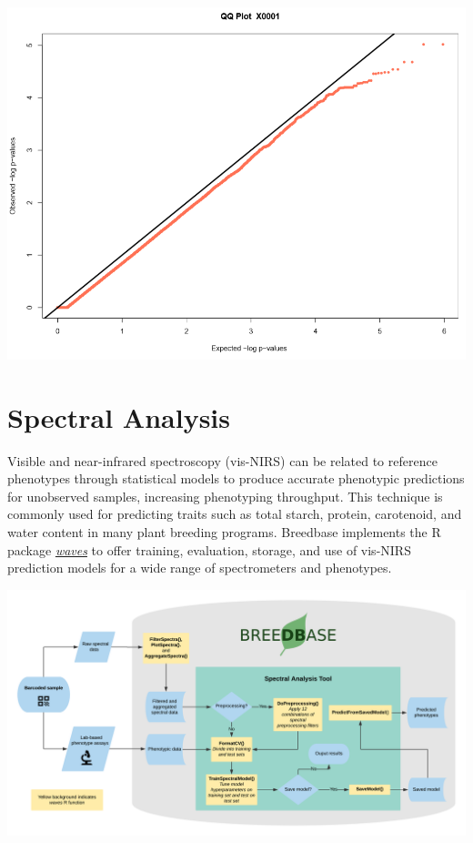 \documentclass[
  12pt,
]{book}
\begin{document}
\begin{center}\includegraphics[width=0.95\linewidth]{assets/images/search_wizard_genotype_analyses_qq_plot} \end{center}

\hypertarget{spectral-analysis}{%
\section{Spectral Analysis}\label{spectral-analysis}}

Visible and near-infrared spectroscopy (vis-NIRS) can be related to reference phenotypes through statistical models to produce accurate phenotypic predictions for unobserved samples, increasing phenotyping throughput. This technique is commonly used for predicting traits such as total starch, protein, carotenoid, and water content in many plant breeding programs. Breedbase implements the R package \href{https://CRAN.R-project.org/package=waves}{\emph{waves}} to offer training, evaluation, storage, and use of vis-NIRS prediction models for a wide range of spectrometers and phenotypes.

\begin{center}\includegraphics[width=0.95\linewidth]{assets/images/waves_breedbase_schema} \end{center}
\end{document}
